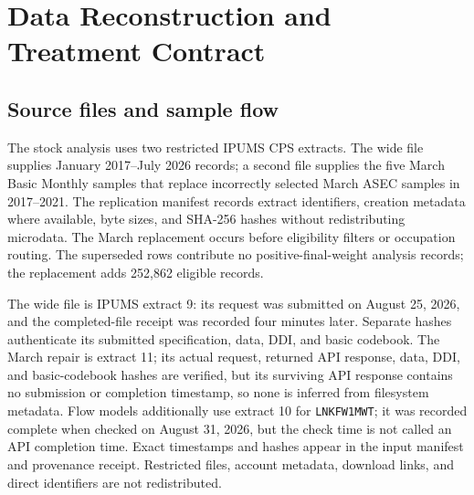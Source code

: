 \section{Data Reconstruction and Treatment Contract}\label{app:data}

\subsection{Source files and sample flow}

The stock analysis uses two restricted IPUMS CPS extracts.  The wide file supplies January 2017--July 2026 records; a second file supplies the five March Basic Monthly samples that replace incorrectly selected March ASEC samples in 2017--2021.  The replication manifest records extract identifiers, creation metadata where available, byte sizes, and SHA-256 hashes without redistributing microdata.  The March replacement occurs before eligibility filters or occupation routing.  The superseded rows contribute no positive-final-weight analysis records; the replacement adds 252,862 eligible records.

The wide file is IPUMS extract 9: its request was submitted on August 25, 2026, and the completed-file receipt was recorded four minutes later.  Separate hashes authenticate its submitted specification, data, DDI, and basic codebook.  The March repair is extract 11; its actual request, returned API response, data, DDI, and basic-codebook hashes are verified, but its surviving API response contains no submission or completion timestamp, so none is inferred from filesystem metadata.  Flow models additionally use extract 10 for \texttt{LNKFW1MWT}; it was recorded complete when checked on August 31, 2026, but the check time is not called an API completion time.  Exact timestamps and hashes appear in the input manifest and provenance receipt.  Restricted files, account metadata, download links, and direct identifiers are not redistributed.

